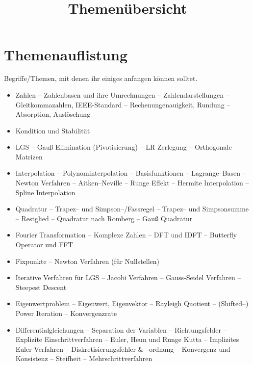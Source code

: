 \documentclass{scrartcl}
\title{\huge Themenübersicht}
\author{\npauthor{}}
\newcommand{\npbase}{../../../}
\newcommand{\subit}{\subitem --  }
\begin{document}
	\twocolumn
	
	\newpage
	
	\section{Themenauflistung}
	
	Begriffe/Themen, mit denen ihr einiges anfangen können solltet.
	

	\begin{itemize}
		\item Zahlen
			\subit Zahlenbasen und ihre Umrechnungen
			\subit Zahlendarstellungen
			\subit Gleitkommazahlen, IEEE-Standard
			\subit Rechenungenauigkeit, Rundung
			\subit Absorption, Auslöschung
		\item Kondition und Stabilität
		\item LGS
			\subit Gauß Elimination (Pivotisierung)
			\subit LR Zerlegung
			\subit Orthogonale Matrizen

		\item Interpolation
			\subit Polynominterpolation
			\subit Basisfunktionen
			\subit Lagrange--Basen
			\subit Newton Verfahren
			\subit Aitken--Neville
			\subit Runge Effekt
			\subit Hermite Interpolation
			\subit Spline Interpolation

		\item Quadratur
			\subit Trapez-- und Simpson--/Fassregel
			\subit Trapez-- und Simpsonsumme
			\subit Restglied
			\subit Quadratur nach Romberg
			\subit Gauß Quadratur

		\item Fourier Transformation
			\subit Komplexe Zahlen
			\subit DFT und IDFT
			\subit Butterfly Operator und FFT

		\item Fixpunkte
			\subit Newton Verfahren (für Nullstellen)
		
		\item Iterative Verfahren für LGS
			\subit Jacobi Verfahren
			\subit Gauss-Seidel Verfahren
			\subit Steepest Descent
			
		\item Eigenwertproblem
			\subit Eigenwert, Eigenvektor
			\subit Rayleigh Quotient
			\subit (Shifted--) Power Iteration
			\subit Konvergenzrate
		
		\item Differentialgleichungen
			\subit Separation der Variablen
			\subit Richtungsfelder
			\subit Explizite Einschrittverfahren
			\subit Euler, Heun und Runge Kutta
			\subit Implizites Euler Verfahren
			\subit Diskretisierungsfehler \& --ordnung
			\subit Konvergenz und Konsistenz
			\subit Steifheit
			\subit Mehrschrittverfahren %
	\end{itemize}
\end{document}
